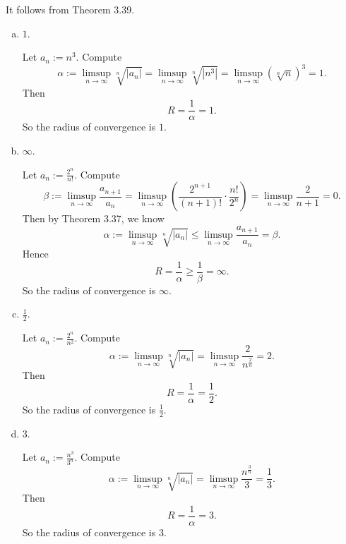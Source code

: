 \begin{Exercise}
It follows from Theorem 3.39.
\begin{enumerate}[(a)]
\item
\begin{answer}
$1$.
\end{answer}
\begin{solution}
Let $a_n := n^3$. Compute
$$
\alpha := \limsup_{n\to\infty} \sqrt[n]{|a_n|}
= \limsup_{n\to\infty} \sqrt[n]{|n^3|}
=\limsup_{n\to\infty} (\sqrt[n]{n})^3
= 1.
$$
Then
$$
R = \frac{1}{\alpha}
= 1.
$$
So the radius of convergence is $1$.
\end{solution}

\item
\begin{answer}
$\infty$.
\end{answer}
\begin{solution}
Let $a_n := \frac{2^n}{n!}$. Compute
$$
\beta := \limsup_{n\to\infty}\frac{a_{n+1}}{a_n}
= \limsup_{n\to\infty}\left( \frac{2^{n+1}}{(n+1)!} \cdot \frac{n!}{2^n} \right) 
= \limsup_{n\to\infty} \frac{2}{n+1}
= 0.
$$
Then by Theorem 3.37, we know
$$
\alpha := \limsup_{n\to\infty} \sqrt[n]{|a_n|} 
\leq \limsup_{n\to\infty}\frac{a_{n+1}}{a_n} 
= \beta.
$$
Hence
$$
R = \frac{1}{\alpha} \geq \frac{1}{\beta} = \infty.
$$
So the radius of convergence is $\infty$.
\end{solution}

\item
\begin{answer}
$\frac{1}{2}$.
\end{answer}
\begin{solution}
Let $a_n := \frac{2^n}{n^2}$. Compute
$$
\alpha := \limsup_{n\to\infty} \sqrt[n]{|a_n|} 
= \limsup_{n\to\infty}\frac{2}{n^{\frac{2}{n}}}
= 2.
$$
Then 
$$
R = \frac{1}{\alpha}
= \frac{1}{2}.
$$
So the radius of convergence is $\frac{1}{2}$.
\end{solution}

\item
\begin{answer}
$3$.
\end{answer}
\begin{solution}
Let $a_n := \frac{n^3}{3^n}$. Compute
$$
\alpha := \limsup_{n\to\infty} \sqrt[n]{|a_n|} 
= \limsup_{n\to\infty}\frac{n^{\frac{3}{n}}}{3}
= \frac{1}{3}.
$$
Then
$$
R = \frac{1}{\alpha}
= 3.
$$
So the radius of convergence is $3$.

\end{solution}
\end{enumerate}
\end{Exercise}